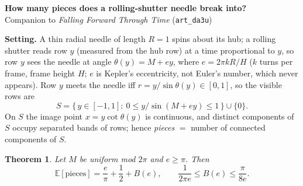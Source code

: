 \documentclass[10pt]{article}
\newtheorem*{theorem}{Theorem}
\begin{document}
\begin{center}
{\Large\bfseries How many pieces does a rolling-shutter needle break into?}\\[2pt]
{\small Companion to \emph{Falling Forward Through Time} (\texttt{art\_da3u})}
\end{center}
\vspace{-4pt}
\textbf{Setting.} A thin radial needle of length $R=1$ spins about its hub; a rolling shutter reads row $y$ (measured from the hub row) at a time proportional to $y$, so row $y$ sees the needle at angle $\theta(y)=M+ey$, where $e=2\pi kR/H$ ($k$ turns per frame, frame height $H$; $e$ is Kepler's eccentricity, not Euler's number, which never appears). Row $y$ meets the needle iff $r=y/\sin\theta(y)\in[0,1]$, so the visible rows are
\[
S=\{\,y\in[-1,1]:\ 0\le y/\sin(M+ey)\le 1\,\}\cup\{0\}.
\]
On $S$ the image point $x=y\cot\theta(y)$ is continuous, and distinct components of $S$ occupy separated bands of rows; hence \emph{pieces} $=$ number of connected components of $S$.

\begin{theorem}
Let $M$ be uniform mod $2\pi$ and $e\ge\pi$. Then
\[
\mathbb{E}[\text{pieces}]=\frac{e}{\pi}+\frac12+B(e),\qquad \frac{1}{2\pi e}\le B(e)\le\frac{\pi}{8e}.
\]
\end{theorem}
\end{document}
